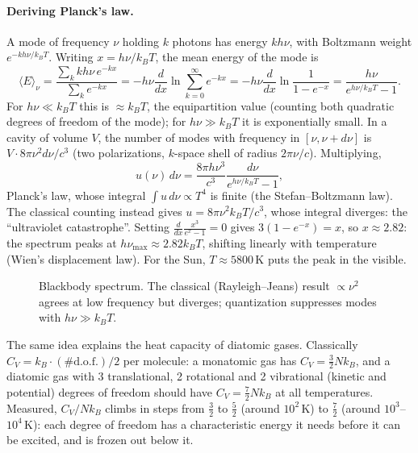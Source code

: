 \paragraph{Deriving Planck's law.} A mode of frequency $\nu$ holding $k$ photons has energy $kh\nu$, with Boltzmann weight $e^{-kh\nu/k_BT}$. Writing $x = h\nu/k_BT$, the mean energy of the mode is
\[
    \langle E\rangle_\nu = \frac{\sum_kkh\nu\,e^{-kx}}{\sum_ke^{-kx}}
    = -h\nu\frac{d}{dx}\ln\sum_{k=0}^\infty e^{-kx}
    = -h\nu\frac{d}{dx}\ln\frac{1}{1-e^{-x}}
    = \frac{h\nu}{e^{h\nu/k_BT}-1}.
\]
For $h\nu\ll k_BT$ this is $\approx k_BT$, the equipartition value (counting both quadratic degrees of freedom of the mode); for $h\nu\gg k_BT$ it is exponentially small. In a cavity of volume $V$, the number of modes with frequency in $[\nu,\nu+d\nu]$ is $V\cdot8\pi\nu^2d\nu/c^3$ (two polarizations, $k$-space shell of radius $2\pi\nu/c$). Multiplying,
\[
    u(\nu)\,d\nu = \frac{8\pi h\nu^3}{c^3}\frac{d\nu}{e^{h\nu/k_BT}-1},
\]
Planck's law, whose integral $\int u\,d\nu\propto T^4$ is finite (the Stefan--Boltzmann law). The classical counting instead gives $u = 8\pi\nu^2k_BT/c^3$, whose integral diverges: the ``ultraviolet catastrophe''. Setting $\frac{d}{dx}\frac{x^3}{e^x-1} = 0$ gives $3(1-e^{-x}) = x$, so $x\approx2.82$: the spectrum peaks at $h\nu_{\max}\approx2.82k_BT$, shifting linearly with temperature (Wien's displacement law). For the Sun, $T\approx5800$\,K puts the peak in the visible.

\begin{figure}[ht]
\centering
{}
\caption{Blackbody spectrum. The classical (Rayleigh--Jeans) result $\propto\nu^2$ agrees at low frequency but diverges; quantization suppresses modes with $h\nu\gg k_BT$.}
\end{figure}

The same idea explains the heat capacity of diatomic gases. Classically $C_V = k_B\cdot(\#\text{d.o.f.})/2$ per molecule: a monatomic gas has $C_V = \frac32Nk_B$, and a diatomic gas with 3 translational, 2 rotational and 2 vibrational (kinetic and potential) degrees of freedom should have $C_V = \frac72Nk_B$ at all temperatures. Measured, $C_V/Nk_B$ climbs in steps from $\frac32$ to $\frac52$ (around $10^2$\,K) to $\frac72$ (around $10^3$--$10^4$\,K): each degree of freedom has a characteristic energy it needs before it can be excited, and is frozen out below it.

